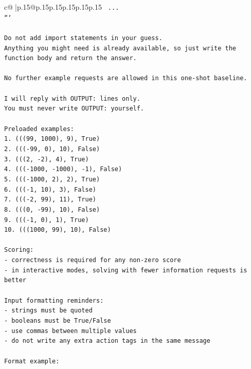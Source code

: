 \documentclass{article}
\begin{document}
{\begin{supertabular}{c@{$\;$}|p{.15\linewidth}@{}p{.15\linewidth}p{.15\linewidth}p{.15\linewidth}p{.15\linewidth}p{.15\linewidth}}
{{{\texttt{    ...} \\
\texttt{```} \\
\\ 
\texttt{Do not add import statements in your guess.} \\
\texttt{Anything you might need is already available, so just write the function body and return the answer.} \\
\\ 
\texttt{No further example requests are allowed in this one{-}shot baseline.} \\
\\ 
\texttt{I will reply with OUTPUT: lines only.} \\
\texttt{You must never write OUTPUT: yourself.} \\
\\ 
\texttt{Preloaded examples:} \\
\texttt{1. (((99, 1000), 9), True)} \\
\texttt{2. ((({-}99, 0), 10), False)} \\
\texttt{3. (((2, {-}2), 4), True)} \\
\texttt{4. ((({-}1000, {-}1000), {-}1), False)} \\
\texttt{5. ((({-}1000, 2), 2), True)} \\
\texttt{6. ((({-}1, 10), 3), False)} \\
\texttt{7. ((({-}2, 99), 11), True)} \\
\texttt{8. (((0, {-}99), 10), False)} \\
\texttt{9. ((({-}1, 0), 1), True)} \\
\texttt{10. (((1000, 99), 10), False)} \\
\\ 
\texttt{Scoring:} \\
\texttt{{-} correctness is required for any non{-}zero score} \\
\texttt{{-} in interactive modes, solving with fewer information requests is better} \\
\\ 
\texttt{Input formatting reminders:} \\
\texttt{{-} strings must be quoted} \\
\texttt{{-} booleans must be True/False} \\
\texttt{{-} use commas between multiple values} \\
\texttt{{-} do not write any extra action tags in the same message} \\
\\ 
\texttt{Format example:} \\
}}}
\end{supertabular}}
\end{document}
